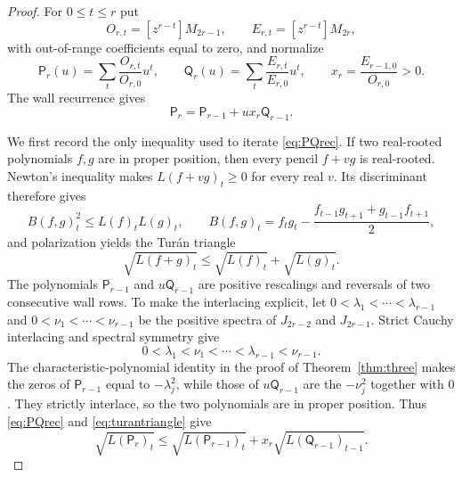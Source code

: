 \documentclass[11pt,a4paper]{article}
\theoremstyle{plain}
\theoremstyle{definition}
\theoremstyle{remark}
\begin{document}
\begin{proof}
For $0\le t\le r$ put
\[
 O_{r,t}=[z^{r-t}]M_{2r-1},\qquad
 E_{r,t}=[z^{r-t}]M_{2r},
\]
with out-of-range coefficients equal to zero, and normalize
\[
 \mathsf P_r(u)=\sum_t\frac{O_{r,t}}{O_{r,0}}u^t,\qquad
 \mathsf Q_r(u)=\sum_t\frac{E_{r,t}}{E_{r,0}}u^t,\qquad
 x_r=\frac{E_{r-1,0}}{O_{r,0}}>0.
\]
The wall recurrence gives
\begin{equation}\label{eq:PQrec}
  \mathsf P_r=\mathsf P_{r-1}+u x_r\mathsf Q_{r-1}.
\end{equation}

We first record the only inequality used to iterate \eqref{eq:PQrec}. If two
real-rooted polynomials $f,g$ are in proper position, then every pencil
$f+vg$ is real-rooted. Newton's inequality makes
$L(f+vg)_t\ge0$ for every real $v$. Its discriminant therefore gives
\[
  B(f,g)_t^2\le L(f)_tL(g)_t,
  \qquad
  B(f,g)_t=f_tg_t-\frac{f_{t-1}g_{t+1}+g_{t-1}f_{t+1}}2,
\]
and polarization yields the Tur\'an triangle
\begin{equation}\label{eq:turantriangle}
  \sqrt{L(f+g)_t}\le\sqrt{L(f)_t}+\sqrt{L(g)_t}.
\end{equation}
The polynomials $\mathsf P_{r-1}$ and $u\mathsf Q_{r-1}$ are positive
rescalings and reversals of two consecutive wall rows. To make the interlacing
explicit, let $0<\lambda_1<\cdots<\lambda_{r-1}$ and
$0<\nu_1<\cdots<\nu_{r-1}$ be the positive spectra of
$J_{2r-2}$ and $J_{2r-1}$. Strict Cauchy interlacing and spectral symmetry give
\[
 0<\lambda_1<\nu_1<\cdots<\lambda_{r-1}<\nu_{r-1}.
\]
The characteristic-polynomial identity in the proof of
Theorem~\ref{thm:three} makes the zeros of $\mathsf P_{r-1}$ equal to
$-\lambda_j^2$, while those of $u\mathsf Q_{r-1}$ are the $-\nu_j^2$ together
with $0$. They strictly interlace, so the two polynomials are in proper
position. Thus \eqref{eq:PQrec} and \eqref{eq:turantriangle} give
\begin{equation}\label{eq:PQtriangle}
 \sqrt{L(\mathsf P_r)_t}\le
 \sqrt{L(\mathsf P_{r-1})_t}+x_r\sqrt{L(\mathsf Q_{r-1})_{t-1}}.
\end{equation}


\end{proof}
\end{document}
